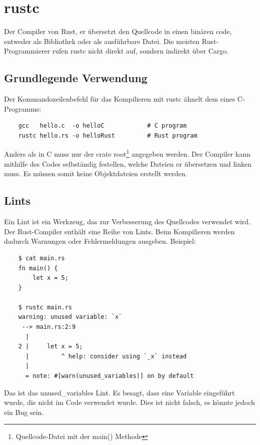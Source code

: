 \section{rustc}

Der Compiler von Rust, er übersetzt den Quellcode in einen binären code, entweder als Bibliothek oder als ausführbare Datei. Die meisten Rust-Programmierer rufen rustc nicht direkt auf, sondern indirekt über Cargo. \cite{RustcBook}

\subsection{Grundlegende Verwendung}

Der Kommandozeilenbefehl für das Kompilieren mit rustc ähnelt dem eines C-Programms:

\begin{lstlisting}
    gcc   hello.c  -o helloC            # C program
    rustc hello.rs -o helloRust         # Rust program
\end{lstlisting}

Anders als in C muss nur der crate root\footnote{Quellcode-Datei mit der main() Methode} angegeben werden. Der Compiler kann mithilfe des Codes selbständig festellen, welche Dateien er übersetzen und linken muss. Es müssen somit keine Objektdateien erstellt werden.

\subsection{Lints}

Ein Lint ist ein Werkzeug, das zur Verbesserung des Quellcodes verwendet wird. Der Rust-Compiler enthält eine Reihe von Lints. Beim Kompilieren werden dadurch Warnungen oder Fehlermeldungen ausgeben. Beispiel:

\begin{lstlisting}
    $ cat main.rs
    fn main() {
        let x = 5;
    }

    $ rustc main.rs
    warning: unused variable: `x`
     --> main.rs:2:9
      |
    2 |     let x = 5;
      |         ^ help: consider using `_x` instead
      |
      = note: #[warn(unused_variables)] on by default
\end{lstlisting}

Das ist das \glqq unused\_variables\grqq{} Lint. Es besagt, dass eine Variable eingeführt wurde, die nicht im Code verwendet wurde. Dies ist nicht falsch, es könnte jedoch ein Bug sein.


